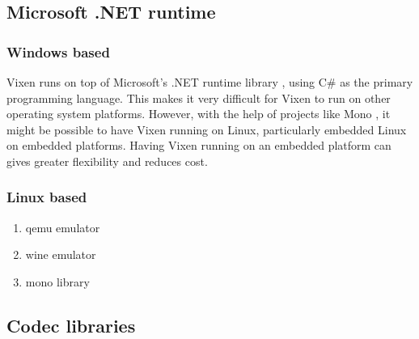 \documentclass[journal]{IEEEtran}
\begin{document}
\subsection{Microsoft .NET runtime}

\subsubsection{Windows based}

Vixen runs on top of Microsoft's .NET runtime library \cite{platt2002introducing}, using C\# \cite{hejlsberg2003c} as the primary programming language. This makes it very difficult for Vixen to run on other operating system platforms. However, with the help of projects like Mono \cite{de2004mono}, it might be possible to have Vixen running on Linux, particularly embedded Linux on embedded platforms. Having Vixen running on an embedded platform can gives greater flexibility and reduces cost.

\subsubsection{Linux based}
\hfill
{}

\begin{enumerate}
	\item qemu emulator
	\item wine emulator
	\item mono library
\end{enumerate}


\subsection{Codec libraries}




\end{document}
